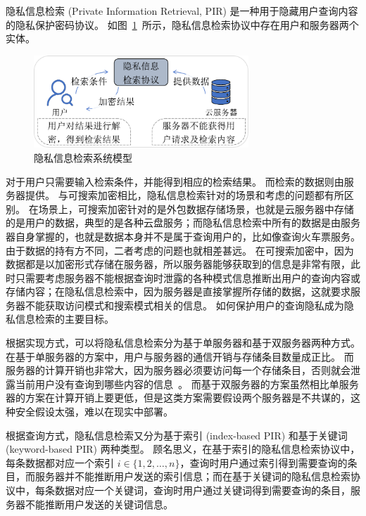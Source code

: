 隐私信息检索 (Private Information Retrieval, PIR) 是一种用于隐藏用户查询内容的隐私保护密码协议。
如图~\ref{fig:pir_protocol}~所示，隐私信息检索协议中存在用户和服务器两个实体。
\begin{figure}[ht]
  \centering
  \includegraphics[width=0.72\textwidth]{figures/pir_pro.pdf}
  \caption{隐私信息检索系统模型}
  \label{fig:pir_protocol}
\end{figure}
对于用户只需要输入检索条件，并能得到相应的检索结果。
而检索的数据则由服务器提供。
与可搜索加密相比，隐私信息检索针对的场景和考虑的问题都有所区别。
在场景上，可搜索加密针对的是外包数据存储场景，也就是云服务器中存储的是用户的数据，典型的是各种云盘服务；而隐私信息检索中所有的数据是由服务器自身掌握的，也就是数据本身并不是属于查询用户的，比如像查询火车票服务。
由于数据的持有方不同，二者考虑的问题也就相差甚远。
在可搜索加密中，因为数据都是以加密形式存储在服务器，所以服务器能够获取到的信息是非常有限，此时只需要考虑服务器不能根据查询时泄露的各种模式信息推断出用户的查询内容或存储内容；在隐私信息检索中，因为服务器是直接掌握所存储的数据，这就要求服务器不能获取访问模式和搜索模式相关的信息。
如何保护用户的查询隐私成为隐私信息检索的主要目标。

根据实现方式，可以将隐私信息检索分为基于单服务器和基于双服务器两种方式。
在基于单服务器的方案中，用户与服务器的通信开销与存储条目数量成正比。
而服务器的计算开销也非常大，因为服务器必须要访问每一个存储条目，否则就会泄露当前用户没有查询到哪些内容的信息~\cite{beimel2004reducing}。
而基于双服务器的方案虽然相比单服务器的方案在计算开销上要更低，但是这类方案需要假设两个服务器是不共谋的，这种安全假设太强，难以在现实中部署。

根据查询方式，隐私信息检索又分为基于索引 (index-based PIR) 和基于关键词 (keyword-based PIR) 两种类型。
顾名思义，在基于索引的隐私信息检索协议中，每条数据都对应一个索引 $i\in \{1, 2, \dots, n\}$，查询时用户通过索引得到需要查询的条目，而服务器并不能推断用户发送的索引信息；而在基于关键词的隐私信息检索协议中，每条数据对应一个关键词，查询时用户通过关键词得到需要查询的条目，服务器不能推断用户发送的关键词信息。

